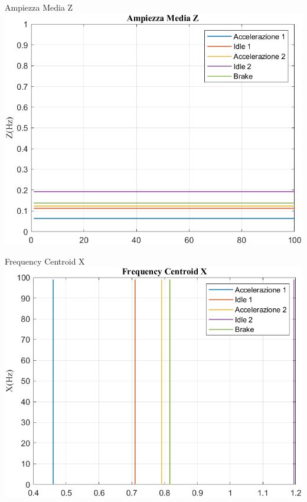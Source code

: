 \documentclass[beamer]{standalone}
\begin{document}
	\begin{frame}{{Ampiezza Media Z}}
		\centering\includegraphics[height=.8\textheight]{figure/Mag/Trasformata/Ampiezza MediaZ}
	\end{frame}
	
	\begin{frame}{{Frequency Centroid X}}
		\centering\includegraphics[height=.8\textheight]{figure/Mag/Trasformata/Frequency CentroidX}
	\end{frame}
	
\end{document}
